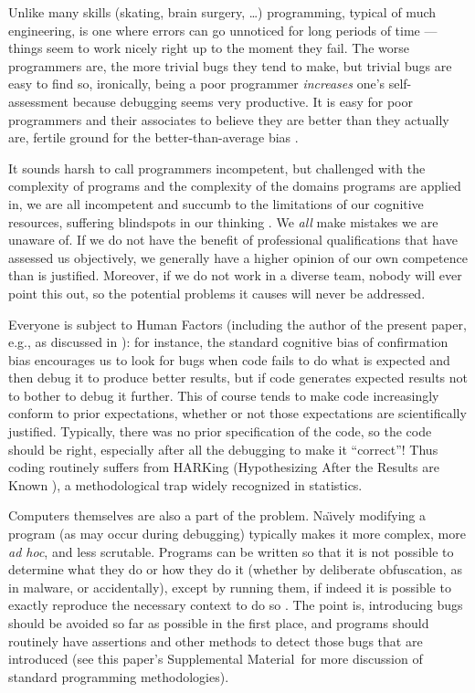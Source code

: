 \documentclass[10pt,a4paper]{article}
\def\supplement{Supplemental Material}
\begin{document}
Unlike many skills (skating, brain surgery, \ldots) programming, typical of much engineering, is one where errors can go unnoticed for long periods of time --- things seem to work nicely right up to the moment they fail. The worse programmers are, the more trivial bugs they tend to make, but trivial bugs are easy to find so, ironically, being a poor programmer \emph{increases\/} one's self-assessment because debugging seems very productive. It is easy for poor programmers and their associates to believe they are better than they actually are, fertile ground for the better-than-average bias \cite{dunning-kruger}.

It sounds harsh to call programmers incompetent, but challenged with the complexity of programs and the complexity of the domains programs are applied in, we are all incompetent and succumb to the limitations of our cognitive resources, suffering blindspots in our thinking \cite{fixit}. We \emph{all\/} make mistakes we are unaware of. If we do not have the benefit of professional qualifications that have assessed us objectively, we generally have a higher opinion of our own competence than is justified. Moreover, if we do not work in a diverse team, nobody will ever point this out, so the potential problems it causes will never be addressed.

{Everyone is subject to Human Factors (including the author of the present paper, e.g., as discussed in \cite{enigma}): for instance, the standard cognitive bias of confirmation bias encourages us to look for bugs when code fails to do what is expected and then debug it to produce better results, but if code generates expected results not to bother to debug it further. This of course tends to make code increasingly conform to prior expectations, whether or not those expectations are scientifically justified. Typically, there was no prior specification of the code, so the code should be right, especially after all the debugging to make it ``correct''! Thus coding routinely suffers from HARKing (Hypothesizing After the Results are Known \cite{harking}), a methodological trap widely recognized in statistics.}

Computers themselves are also a part of the problem. Na\"\i vely modifying a program (as may occur during debugging) typically makes it more complex, more \emph{ad hoc}, and less scrutable. Programs can be written so that it is not possible to determine what they do or how they do it (whether by deliberate obfuscation, as in malware, or accidentally), except by running them, if indeed it is possible to exactly reproduce the necessary context to do so \cite{viruses}. The point is, introducing bugs should be avoided so far as possible in the first place, and programs should routinely have assertions and other methods to detect those bugs that are introduced (see this paper's \supplement\ for more discussion of standard programming methodologies).
\end{document}
